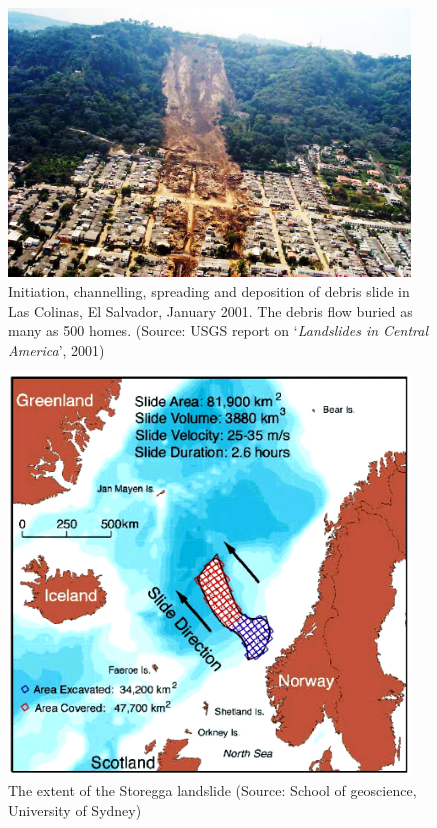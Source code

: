 \begin{figure}[tbhp]
\centering
\includegraphics[width=0.95\textwidth]{Debrisflow}
\caption[Debris slide in Las Colinas, El Salvador, January 2001]{Initiation, 
channelling, spreading and deposition of debris slide in Las Colinas, El 
Salvador, January 2001. The debris flow buried as many as 500 homes. (Source: 
USGS report on `\textit{Landslides in Central America}', 2001)}
\label{fig:debris}
\end{figure}

\begin{figure}[tbhp]
\centering
\includegraphics[width=0.95\textwidth]{Storegga}
\caption[The extent of the Storegga landslide]{The extent of the Storegga 
landslide (Source: School of geoscience, University of Sydney)}
\label{fig:Landslide}
\end{figure}

